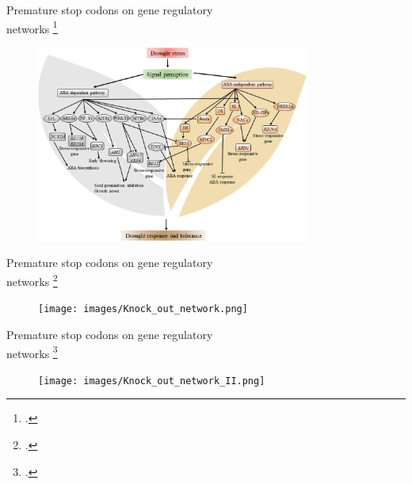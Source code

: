 \documentclass{beamer}
\begin{document}
\begin{frame}{Premature stop codons on gene regulatory \\networks \footcite{Yao2021}}
	\begin{figure}[tb]
		\centering
		\begin{minipage}[h]{1\textwidth}
		\centering
		\includegraphics[width=0.8\textwidth]{images/ABA_Network.jpg}
		\label{fig:Example_Network}
		\end{minipage}
	\end{figure}
\end{frame}
\begin{frame}{Premature stop codons on gene regulatory \\networks \footcite{Yao2021}}
	\begin{figure}[tb]
		\centering
		\begin{minipage}[h]{1\textwidth}
		\centering
		\texttt{[image: images/Knock\_out\_network.png]}
		\label{fig:Example_Network_with_knock_out}
		\end{minipage}
	\end{figure}
\end{frame}
\begin{frame}{Premature stop codons on gene regulatory \\networks \footcite{Yao2021}}
	\begin{figure}[tb]
		\centering
		\begin{minipage}[h]{1\textwidth}
		\centering
		\texttt{[image: images/Knock\_out\_network\_II.png]}
		\label{fig:Example_Network_with_knock_outII}
		\end{minipage}
	\end{figure}
\end{frame}
\end{document}

